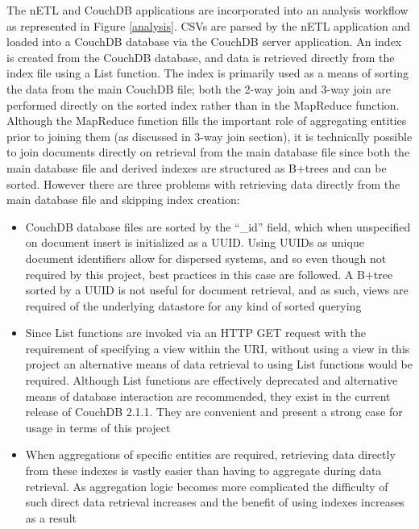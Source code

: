 \label{chapter-analysis}

The nETL and CouchDB applications are incorporated into an analysis workflow as represented in Figure \ref{analysis}. CSVs are parsed by the nETL application and loaded into a CouchDB database via the CouchDB server application. An index is created from the CouchDB database, and data is retrieved directly from the index file using a List function. The index is primarily used as a means of sorting the data from the main CouchDB file; both the 2-way join and 3-way join are performed directly on the sorted index rather than in the MapReduce function. Although the MapReduce function fills the important role of aggregating entities prior to joining them (as discussed in 3-way join section), it is technically possible to join documents directly on retrieval from the main database file since both the main database file and derived indexes are structured as B+trees and can be sorted. However there are three problems with retrieving data directly from the main database file and skipping index creation:

\begin{itemize}
    \item CouchDB database files are sorted by the ``\_id'' field, which when unspecified on document insert is initialized as a UUID. Using UUIDs as unique document identifiers allow for dispersed systems, and so even though not required by this project, best practices in this case are followed. A B+tree sorted by a UUID is not useful for document retrieval, and as such, views are required of the underlying datastore for any kind of sorted querying
    \item Since List functions are invoked via an HTTP GET request with the requirement of specifying a view within the URI, without using a view in this project an alternative means of data retrieval to using List functions would be required. Although List functions are effectively deprecated and alternative means of database interaction are recommended, they exist in the current release of CouchDB 2.1.1. They are convenient and present a strong case for usage in terms of this project
    \item When aggregations of specific entities are required, retrieving data directly from these indexes is vastly easier than having to aggregate during data retrieval. As aggregation logic becomes more complicated the difficulty of such direct data retrieval increases and the benefit of using indexes increases as a result
\end{itemize}

